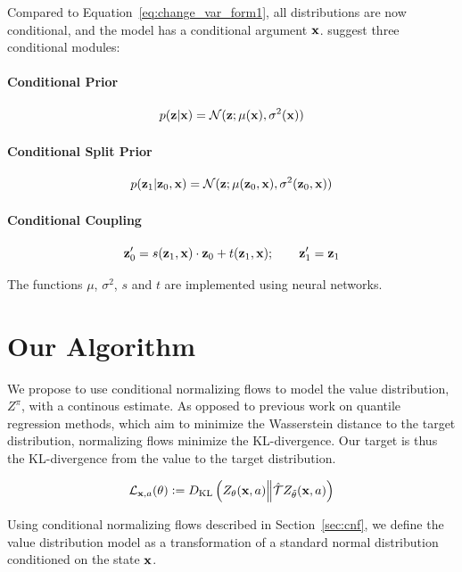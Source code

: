 \documentclass[twoside]{article}
\begin{document}
\noindent
Compared to Equation~\eqref{eq:change_var_form1}, all distributions are now
conditional, and the model has a conditional argument \(\textbf{x}\).
\citet{winkler19} suggest three conditional modules:

\paragraph{Conditional Prior}
\begin{equation*}
  p(\textbf{z} \vert \textbf{x}) = \mathcal{N}(\textbf{z} ; \mu(\textbf{x}), \sigma^2(\textbf{x}))
\end{equation*}
\paragraph{Conditional Split Prior}
\begin{equation*}
  p(\textbf{z}_1 \vert \textbf{z}_0, \textbf{x}) =
  \mathcal{N} (\textbf{z} ; \mu(\textbf{z}_0, \textbf{x}), \sigma^2(\textbf{z}_0, \textbf{x}))
\end{equation*}
\paragraph{Conditional Coupling}
\begin{equation*}
  \textbf{z}^\prime_0 = 
  s(\textbf{z}_1, \textbf{x}) \cdot \textbf{z}_0 + t(\textbf{z}_1, \textbf{x}); \qquad \textbf{z}^\prime_1 = \textbf{z}_1
\end{equation*}

The functions \(\mu\), \(\sigma^2\), \(s\) and \(t\) are implemented using
neural networks.

\section{Our Algorithm}

We propose to use conditional normalizing flows to model the value distribution,
\(Z^\pi\), with a continous estimate. As opposed to previous work on 
quantile regression methods, which aim to minimize the Wasserstein distance
to the target distribution, normalizing flows minimize the KL-divergence. Our
target is thus the KL-divergence from the value to the target distribution.

\begin{equation}
  \mathcal{L}_{\textbf{x},a}(\theta) \vcentcolon= D_{\mathrm{KL}}\left( Z_{\theta}(\textbf{x},a) \middle\Vert \hat{\mathcal{T}}
  Z_{\tilde{\theta}}(\textbf{x},a) \right)
\end{equation}

Using conditional normalizing flows described in Section~\ref{sec:cnf}, we
define the value distribution model as a transformation of a
standard normal distribution conditioned on the state \(\textbf{x}\).
\end{document}
